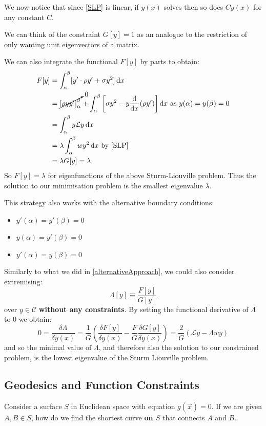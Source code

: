 \documentclass[../main.tex]{subfiles}
\begin{document}
We now notice that since \cref{SLP} is linear, if $y(x)$ solves then so does $Cy(x)$ for any constant $C$.
\begin{remark}
  We can think of the constraint $G[y] = 1$ as an analogue to the restriction of only wanting unit eigenvectors of a matrix.
\end{remark}
We can also integrate the functional $F[y]$ by parts to obtain:
\begin{align*}
  F[y] &= \int_{\alpha}^{\beta} [y' \cdot \rho y' + \sigma y^2] \d{x} \\
       &= \cancelto{0}{\eval{\rho y y'}{\alpha}{\beta}} + \int_{\alpha}^{\beta} \left[\sigma y^2 - y \deriv{}{x}(\rho y')\right] \d{x} \text{ as $y(\alpha) = y(\beta) = 0$} \\
       &= \int_{\alpha}^{\beta} y \mathcal{L} y \d{x} \\
       &= \lambda \int_{\alpha}^{\beta} w y^2 \d{x} \text{ by \cref{SLP}} \\
       &= \lambda G[y] = \lambda
\end{align*}
So $F[y] = \lambda$ for eigenfunctions of the above Sturm-Liouville problem.
Thus the solution to our minimisation problem is the smallest eigenvalue $\lambda$.
\begin{remark}[Remark]
  This strategy also works with the alternative boundary conditions:
  \begin{itemize}
    \item $y'(\alpha) = y'(\beta) = 0$
    \item $y(\alpha) = y'(\beta) = 0$
    \item $y'(\alpha) = y(\beta) = 0$
  \end{itemize}
\end{remark}
Similarly to what we did in \cref{alternativeApproach}, we could also consider extremising:
\[
  \Lambda[y] \equiv \frac{F[y]}{G[y]}
\]
over $y \in \mathscr{C}$ \textbf{without any constraints}.
By setting the functional derivative of $\Lambda$ to 0 we obtain:
\[
  0 = \frac{\delta \Lambda}{\delta y(x)} = \frac{1}{G}\left(\frac{\delta F[y]}{\delta y(x)} - \frac{F}{G} \frac{\delta G[y]}{\delta y(x)}\right) = \frac{2}{G}(\mathcal{L}y - \Lambda w y)
\]
and so the minimal value of $\Lambda$, and therefore also the solution to our constrained problem, is the lowest eigenvalue of the Sturm Liouville problem.
\subsection{Geodesics and Function  Constraints}
Consider a surface $S$ in Euclidean space with equation $g(\vec{x}) = 0$.
If we are given $A, B \in S$, how do we find the shortest curve \textbf{on $S$} that connects $A$ and $B$.
\end{document}
